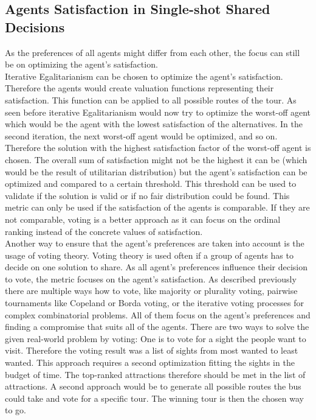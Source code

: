 \documentclass[german, a4paper, 11pt, oneside]{scrbook}
\begin{document}
\subsection{Agents Satisfaction in Single-shot Shared Decisions}
As the preferences of all agents might differ from each other, the focus can still be on optimizing the agent's satisfaction. 
\\Iterative Egalitarianism can be chosen to optimize the agent's satisfaction. Therefore the agents would create valuation functions representing their satisfaction. This function can be applied to all possible routes of the tour. As seen before iterative Egalitarianism would now try to optimize the worst-off agent which would be the agent with the lowest satisfaction of the alternatives. In the second iteration, the next worst-off agent would be optimized, and so on. Therefore the solution with the highest satisfaction factor of the worst-off agent is chosen. The overall sum of satisfaction might not be the highest it can be (which would be the result of utilitarian distribution) but the agent's satisfaction can be optimized and compared to a certain threshold. This threshold can be used to validate if the solution is valid or if no fair distribution could be found. This metric can only be used if the satisfaction of the agents is comparable. If they are not comparable, voting is a better approach as it can focus on the ordinal ranking instead of the concrete values of satisfaction.
\\Another way to ensure that the agent's preferences are taken into account is the usage of voting theory. Voting theory is used often if a group of agents has to decide on one solution to share. As all agent's preferences influence their decision to vote, the metric focuses on the agent's satisfaction. As described previously there are multiple ways how to vote, like majority or plurality voting, pairwise tournaments like Copeland or Borda voting, or the iterative voting processes for complex combinatorial problems. All of them focus on the agent's preferences and finding a compromise that suits all of the agents. There are two ways to solve the given real-world problem by voting: One is to vote for a sight the people want to visit. Therefore the voting result was a list of sights from most wanted to least wanted. This approach requires a second optimization fitting the sights in the budget of time. The top-ranked attractions therefore should be met in the list of attractions. A second approach would be to generate all possible routes the bus could take and vote for a specific tour. The winning tour is then the chosen way to go.
\end{document}
